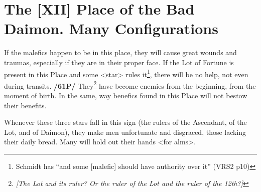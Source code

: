\section{The [XII] Place of the Bad Daimon. Many Configurations}
If the malefics happen to be in this place, they will cause great wounds and traumas, especially if they are in their proper face. 
If the Lot of Fortune is present in this Place and some <star> rules it\footnote{Schmidt has ``and some [malefic] should have authority over it'' (VRS2 p10)}, there will be no help, not even during transits. \textbf{/61P/} They\footnote{\textit{[The Lot and its ruler? Or the ruler of the Lot and the ruler of the 12th?]}} have become enemies from the beginning, from the moment of birth. In the same, way benefics found in this Place will not bestow their benefits. 

Whenever these three stars fall in this sign (the rulers of the Ascendant, of the Lot, and of Daimon), they make men unfortunate and disgraced, those lacking their daily bread. Many will hold out their hands <for alms>.

\newpage